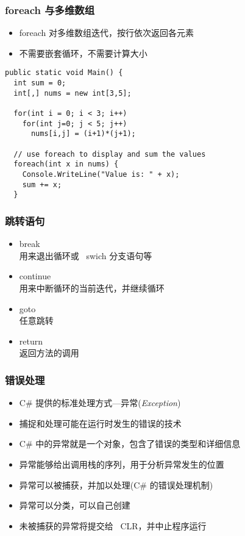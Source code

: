 
\begin{frame}[fragile]
\frametitle{foreach 与多维数组}
\begin{itemize}
\item foreach 对多维数组迭代，按行依次返回各元素
\item 不需要嵌套循环，不需要计算大小
\end{itemize}
\begin{lstlisting}
public static void Main() {
  int sum = 0;
  int[,] nums = new int[3,5];

  for(int i = 0; i < 3; i++)
    for(int j=0; j < 5; j++)
      nums[i,j] = (i+1)*(j+1);

  // use foreach to display and sum the values
  foreach(int x in nums) {
    Console.WriteLine("Value is: " + x);
    sum += x;
  }
\end{lstlisting}
\end{frame}


\begin{frame}
\frametitle{跳转语句}
\begin{itemize}
\item break \\用来退出循环或~ swich 分支语句等
\item continue \\用来中断循环的当前迭代，并继续循环
\item goto \\任意跳转
\item return \\返回方法的调用
\end{itemize}
\end{frame}

\begin{frame}
\frametitle{错误处理}
\begin{itemize}
    \setlength{\itemsep}{8pt plus 1pt}
\item C\# 提供的标准处理方式---异常(\textit{Exception})
\item 捕捉和处理可能在运行时发生的错误的技术
\item C\# 中的异常就是一个对象，包含了错误的类型和详细信息
\item 异常能够给出调用栈的序列，用于分析异常发生的位置
\item 异常可以被捕获，并加以处理(C\# 的错误处理机制)
\item 异常可以分类，可以自己创建
\item 未被捕获的异常将提交给 ~CLR，并中止程序运行
\end{itemize}

\end{frame}

